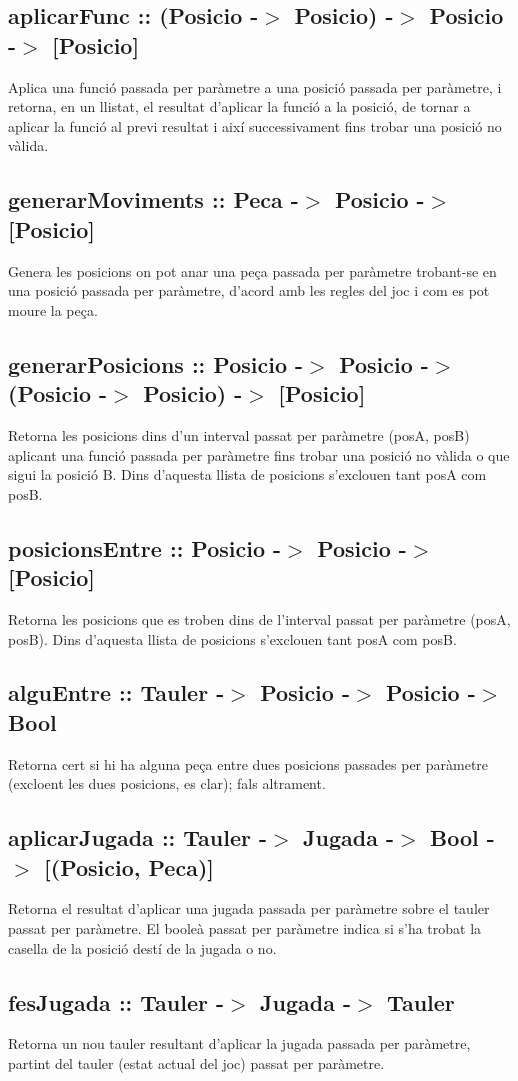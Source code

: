 \documentclass{article}
\begin{document}
\subsection*{aplicarFunc :: (Posicio -$>$ Posicio) -$>$ Posicio -$>$ [Posicio]}
Aplica una funció passada per paràmetre a una posició
passada per paràmetre, i retorna, en un llistat, el resultat
d'aplicar la funció a la posició, de tornar a aplicar la funció
al previ resultat i així successivament fins trobar una
posició no vàlida.
\subsection*{generarMoviments :: Peca -$>$ Posicio -$>$ [Posicio]}
Genera les posicions on pot anar una peça passada per
paràmetre trobant-se en una posició passada per paràmetre,
d'acord amb les regles del joc i com es pot moure la peça.
\subsection*{generarPosicions :: Posicio -$>$ Posicio -$>$ (Posicio -$>$ Posicio) -$>$ [Posicio]}
Retorna les posicions dins d'un interval passat per paràmetre
(posA, posB) aplicant una funció passada per paràmetre fins
trobar una posició no vàlida o que sigui la posició B.
Dins d'aquesta llista de posicions s'exclouen tant posA com posB.
\subsection*{posicionsEntre :: Posicio -$>$ Posicio -$>$ [Posicio]}
Retorna les posicions que es troben dins de l'interval passat
per paràmetre (posA, posB). Dins d'aquesta llista de posicions
s'exclouen tant posA com posB.
\subsection*{alguEntre :: Tauler -$>$ Posicio -$>$ Posicio -$>$ Bool}
Retorna cert si hi ha alguna peça entre dues posicions
passades per paràmetre (excloent les dues posicions, es clar);
fals altrament.
\subsection*{aplicarJugada :: Tauler -$>$ Jugada -$>$ Bool -$>$ [(Posicio, Peca)]}
Retorna el resultat d'aplicar una jugada passada per paràmetre
sobre el tauler passat per paràmetre. El booleà passat per paràmetre
indica si s'ha trobat la casella de la posició destí de la jugada o no.
\subsection*{fesJugada :: Tauler -$>$ Jugada -$>$ Tauler}
Retorna un nou tauler resultant d'aplicar la jugada passada per
paràmetre, partint del tauler (estat actual del joc) passat per
paràmetre.
\end{document}

